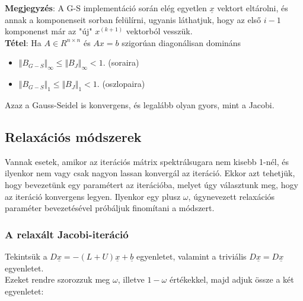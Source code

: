 \documentclass[tikz,12pt,margin=0px]{article}
\begin{document}
	
	\noindent \textbf{Megjegyzés}: A G-S implementáció során elég egyetlen $\underline{x}$ vektort eltárolni, és annak a komponenseit sorban felülírni, ugyanis
	láthatjuk, hogy az első $i-1$ komponenst már az "új" $x^{(k+1)}$ vektorból vesszük.\\
	
	\noindent \textbf{Tétel}: Ha $A \in R^{n \times n}$ és $Ax = b$ szigorúan diagonálisan domináns
	\begin{itemize}
		\item $\Vert B_{G-S} \Vert_{\infty} \leq \Vert B_{J} \Vert_{\infty} < 1$. (soraira)
		\item $\Vert B_{G-S} \Vert_{1} \leq \Vert B_{J} \Vert_{1} < 1$. (oszlopaira)
	\end{itemize}
	
	\noindent Azaz a Gauss-Seidel is konvergens, és legalább olyan gyors, mint a Jacobi.

    \subsection*{Relaxációs módszerek}

    \noindent Vannak esetek, amikor az iterációs mátrix spektrálsugara nem kisebb 1-nél, és ilyenkor nem vagy csak nagyon lassan konvergál az iteráció. Ekkor azt tehetjük, hogy bevezetünk egy paramétert az iterációba, melyet úgy választunk meg, hogy az iteráció konvergens legyen. Ilyenkor egy plusz $\omega$, úgynevezett relaxációs paraméter bevezetésével próbáljuk finomítani a módszert.

	\subsubsection*{A relaxált Jacobi-iteráció}
	
    \noindent Tekintsük a $D\underline{x} = -(L + U)\underline{x} + \underline{b}$ egyenletet, valamint a triviális $D\underline{x} =
	D\underline{x}$ egyenletet.\\
    Ezeket rendre szorozzuk meg $\omega$, illetve $1 - \omega$ értékekkel, majd adjuk össze a két
	egyenletet:
\end{document}
